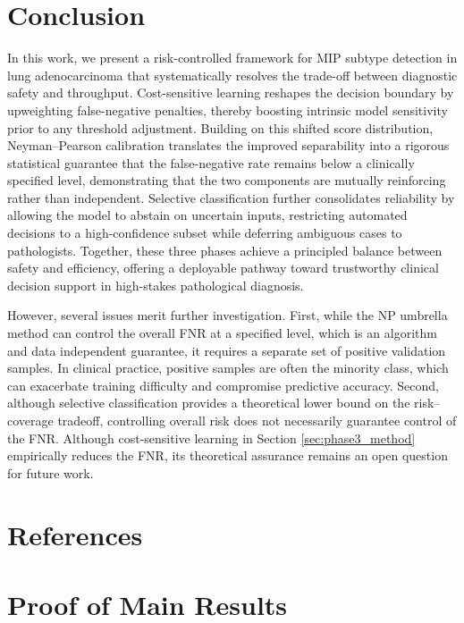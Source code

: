 \documentclass[journal,twoside,web]{ieeecolor}
\begin{document}
\section{Conclusion}

In this work, we present a risk-controlled framework for MIP subtype detection in lung adenocarcinoma that systematically resolves the trade-off between diagnostic safety and throughput. Cost-sensitive learning reshapes the decision boundary by upweighting false-negative penalties, thereby boosting intrinsic model sensitivity prior to any threshold adjustment. Building on this shifted score distribution, Neyman--Pearson calibration translates the improved separability into a rigorous statistical guarantee that the false-negative rate remains below a clinically specified level, demonstrating that the two components are mutually reinforcing rather than independent. Selective classification further consolidates reliability by allowing the model to abstain on uncertain inputs, restricting automated decisions to a high-confidence subset while deferring ambiguous cases to pathologists. Together, these three phases achieve a principled balance between safety and efficiency, offering a deployable pathway toward trustworthy clinical decision support in high-stakes pathological diagnosis.

However, several issues merit further investigation. First, while the NP umbrella method can control the overall FNR at a specified level, which is an algorithm and data independent guarantee, it requires a separate set of positive validation samples. In clinical practice, positive samples are often the minority class, which can exacerbate training difficulty and compromise predictive accuracy. Second, although selective classification provides a theoretical lower bound on the risk–coverage tradeoff, controlling overall risk does not necessarily guarantee control of the FNR. Although cost-sensitive learning in Section \ref{sec:phase3_method} empirically reduces the FNR, its theoretical assurance remains an open question for future work.


\section*{References}





\appendices

\section{Proof of Main Results}\label{S6}
\end{document}
